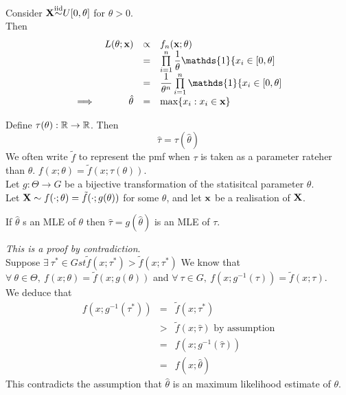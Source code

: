 \documentclass[11pt,a4paper]{article}
\begin{document}

Consider $\textbf{X}{\overset{\text{iid}}{\sim}}U[0,\theta]$ for $\theta>0$.\\
Then
\[\begin{array}{rrcl}
&L(\theta;\x)&\propto&f_n(\x;\theta)\\
&&=&\prod\limits_{i=1}^n\dfrac{1}{\theta}\mathds{1}\{x_i\in[0,\theta]\\
&&=&\dfrac{1}{\theta^n}\prod\limits_{i=1}^n\mathds{1}\{x_i\in[0,\theta]\\
\implies&\hat{\theta}&=&\max\{x_i:x_i\in\x\}
\end{array}\]

Define $\tau(\theta):\mathbb{R}\to\mathbb{R}$. Then
$$\hat{\tau}=\tau(\hat{\theta})$$
\nb We often write $\tilde{f}$ to represent the pmf when $\tau$ is taken as a parameter rateher than $\theta$. \ie $f(x;\theta)=\tilde{f}(x;\tau(\theta))$.\\

Let $g:\Theta\to G$ be a bijective transformation of the statisitcal parameter $\theta$.\\
Let $\textbf{X}\sim f(\cdot;\theta)=\tilde{f}(\cdot;g(\theta))$ for some $\theta$, and let $\textbf{x}$ be a realisation of $\textbf{X}$.
\begin{center}
If $\hat{\theta}$ s an MLE of $\theta$ then $\hat{\tau}=g(\hat{\theta})$ is an MLE of $\tau$.
\end{center}

\textit{This is a proof by contradiction}.\\
Suppose $\exists\ \tau^*\in G st \tilde{f}(x;\tau^*)>\tilde{f}(x;\tau^*)$
We know that $\forall\ \theta\in\Theta,\ f(x;\theta)=\tilde{f}(x;g(\theta))$ and $\forall\ \tau\in G,\ f(x;g^{-1}(\tau))=\tilde{f}(x;\tau)$.\\
We deduce that
\[\begin{array}{rcl}
f(x;g^{-1}(\tau^*))&=&\tilde{f}(x;\tau^*)\\
&>&\tilde{f}(x;\hat{\tau})\text{ by assumption}\\
&=&f(x;g^{-1}(\hat{\tau}))\\
&=&f(x;\hat{\theta})
\end{array}\]
This contradicts the assumption that $\hat{\theta}$ is an maximum likelihood estimate of $\theta$.\\
\proved
\end{document}
